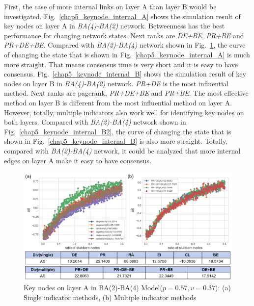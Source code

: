 First, the case of more internal links on layer A than layer B would be investigated. 
Fig.~\ref{chap5_keynode_internal_A} shows the simulation result of key nodes on layer A in \textit{BA(4)-BA(2)} network. Betweenness has the best performance for changing network states. Next ranks are \textit{DE+BE}, \textit{PR+BE} and \textit{PR+DE+BE}. Compared with \textit{BA(2)-BA(4)} network shown in Fig.~\ref{chap5_keynode_internal_A2}, the curve of changing the state that is shown in Fig.~\ref{chap5_keynode_internal_A} is much more straight. That means consensus time is very short and it is easy to have consensus.   
Fig.~\ref{chap5_keynode_internal_B} shows the simulation result of key nodes on layer B in \textit{BA(4)-BA(2)} network. \textit{PR+DE} is the most influential method. Next ranks are pagerank, \textit{PR+DE+BE} and \textit{PR+BE}. The most effective method on layer B is different from the most influential method on layer A. However, totally, multiple indicators also work well for identifying key nodes on both layers. Compared with \textit{BA(2)-BA(4)} network shown in Fig.~\ref{chap5_keynode_internal_B2}, the curve of changing the state that is shown in Fig.~\ref{chap5_keynode_internal_B} is also more straight.  
Totally, compared with \textit{BA(2)-BA(4)} network, it could be analyzed that more internal edges on layer A make it easy to have consensus. 
\begin{figure}[!htb]
	\centering
	\includegraphics[width=\hsize]{figure/chap5_keynode_internal_A2.png}
	\caption{Key nodes on layer A in BA(2)-BA(4) Model($p=0.57, v=0.37$):
		(a) Single indicator methods, (b) Multiple indicator methods}
	\label{chap5_keynode_internal_A2}
\end{figure}
